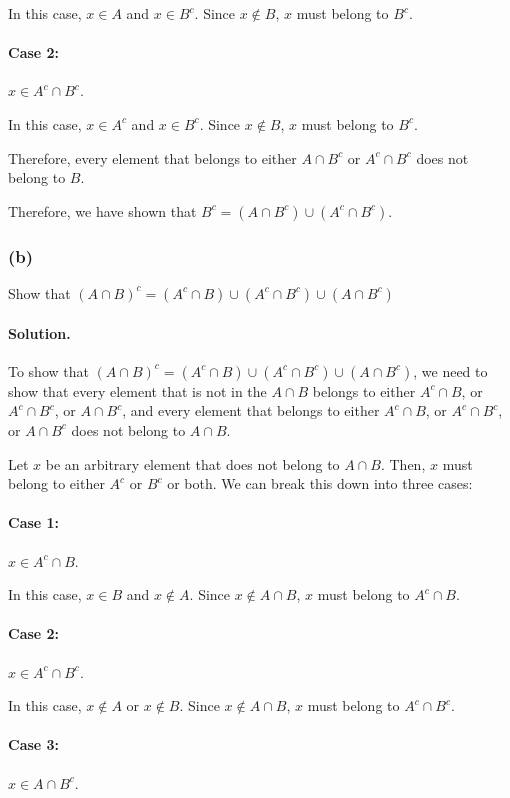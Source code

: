 In this case, $x \in A$ and $x \in B^c$. Since $x \not\in B$, $x$ must belong to $B^c$.

\paragraph{Case 2:} $x \in A^c \cap B^c$.

In this case, $x \in A^c$ and $x \in B^c$. Since $x \not \in B$, $x$ must belong to $B^c$.

Therefore, every element that belongs to either $A \cap B^c$ or $A^c \cap B^c$ does not belong to $B$.

Therefore, we have shown that $B^c = (A \cap B^c) \cup (A^c \cap B^c)$.

\subsubsection{(b)} Show that
$(A \cap B)^c =(A^c \cap B)\cup(A^c \cap B^c)\cup(A\cap B^c)$
\paragraph{Solution.}
To show that $(A\cap B)^c =(A^c \cap B)\cup(A^c \cap B^c)\cup( A \cap B^c)$,
we need to show that every element that is not in the $A\cap B$ belongs to either $A^c \cap B$,
or $A^c \cap B^c$, or $A \cap B^c$, and every element that belongs to either $A^c \cap B$,
or $A^c \cap B^c$, or $A \cap B^c$ does not belong to $A \cap B$.

Let $x$ be an arbitrary element that does not belong to $A \cap B$.
Then, $x$ must belong to either $A^c$ or $B^c$ or both. We can break this down into three cases:

\paragraph{Case 1:} $x \in A^c \cap B$.

In this case, $x \in B$ and $x \not \in A$. Since $x \not \in A \cap B$,
$x$ must belong to $A^c \cap B$.

\paragraph{Case 2:} $x \in A^c \cap B^c$.

In this case, $x \not \in A$ or $x \not \in B$. Since $x \not \in A\cap B$, $x$ must belong to $A^c \cap B^c$.

\paragraph{Case 3:} $x \in A \cap B^c$.

